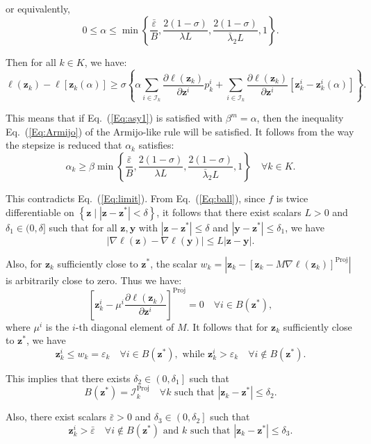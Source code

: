 \documentclass{article}
\theoremstyle{plain}
\theoremstyle{definition}
\def \y {\mathbf{y}}
\def \sI {\mathcal{I}}
\def \y {\mathbf{y}}
\def \z {\mathbf{z}}
\begin{document}
or equivalently, 
\begin{equation}
\label{Eq:asy1}
    0 \leq \alpha \leq \min \left\{\frac{\bar{\varepsilon}}{B}, \frac{2(1 - \sigma)}{\lambda L}, \frac{2(1 - \sigma)}{\bar{\lambda}_2 L}, 1\right\}.
\end{equation}


Then for all \(k \in K\), we have: 
\[
\ell\left(\z_k\right) - \ell\left[\z_k(\alpha)\right] \geq \sigma\left\{\alpha \sum_{i \in \sI_k} \frac{\partial \ell\left(\z_k\right)}{\partial \z^i} p_k^i + \sum_{i \in \sI_k} \frac{\partial \ell\left(\z_k\right)}{\partial \z^i}\left[\z_k^i - \z_k^i(\alpha)\right]\right\}.
\]

This means that if Eq.~(\ref{Eq:asy1}) is satisfied with \(\beta^m = \alpha\), then the inequality Eq.~(\ref{Eq:Armijo}) of the Armijo-like rule will be satisfied. It follows from the way the stepsize is reduced that \(\alpha_k\) satisfies:
\[
  \alpha_k \geq \beta \min \left\{\frac{\bar{\varepsilon}}{B}, \frac{2(1 - \sigma)}{\lambda L}, \frac{2(1 - \sigma)}{\bar{\lambda}_2 L}, 1\right\} \quad \forall k \in K.
\]

This contradicts Eq.~(\ref{Eq:limit}). 
From Eq.~(\ref{Eq:ball}), since \(f\) is twice differentiable on \(\left\{\z \mid \left|\z - \z^*\right| < \delta\right\}\), it follows that there exist scalars \(L > 0\) and \(\delta_1 \in (0, \delta]\) such that for all \(\z, \y\) with \(\left|\z - \z^*\right| \leq \delta\) and \(\left|\y - \z^*\right| \leq \delta_1\), we have
\[
|\nabla \ell(\z) - \nabla \ell(\y)| \leq L|\z - \y|.
\]

Also, for \(\z_k\) sufficiently close to \(\z^*\), the scalar $
w_k = \left|\z_k - \left[\z_k - M \nabla \ell\left(\z_k\right)\right]^{\operatorname{Proj}}\right|
$ is arbitrarily close to zero. Thus we have:
\[
  \left[\z_k^i - \mu^i \frac{\partial \ell\left(\z_k\right)}{\partial \z^i}\right]^{\operatorname{Proj}} = 0 \quad \forall i \in B\left(\z^*\right),
\]
where \(\mu^i\) is the \(i\)-th diagonal element of \(M\). It follows that for \(\z_k\) sufficiently close to \(\z^*\), we have
\[
  \z_k^i \leq w_k = \varepsilon_k \quad \forall i \in B\left(\z^*\right), \text{ while } \z_k^i > \varepsilon_k \quad \forall i \notin B\left(\z^*\right).
\]

This implies that there exists \(\delta_2 \in\left(0, \delta_1\right]\) such that
\[
B\left(\z^*\right) = \sI_k^{\operatorname{Proj}} \quad \forall k \text{ such that } \left|\z_k - \z^*\right| \leq \delta_2.
\]

Also, there exist scalars \(\bar{\varepsilon} > 0\) and \(\delta_3 \in\left(0, \delta_2\right]\) such that
\[
\z_k^i > \bar{\varepsilon} \quad \forall i \notin B\left(\z^*\right) \text{ and } k \text{ such that } \left|\z_k - \z^*\right| \leq \delta_3.
\]
\end{document}
